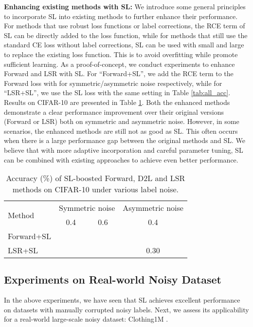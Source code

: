 \documentclass[10pt,twocolumn,letterpaper]{article}
\begin{document}
\noindent\textbf{Enhancing existing methods with SL:}
We introduce some general principles to incorporate SL into existing methods to further enhance their performance. For methods that use robust loss functions or label corrections, the RCE term of SL can be directly added to the loss function, while for methods that still use the standard CE loss without label corrections, SL can be used with small  and large  to replace the existing loss function. This is to avoid overfitting while promote sufficient learning. As a proof-of-concept, we conduct experiments to enhance Forward and LSR with SL. For ``Forward+SL'', we add the RCE term to the Forward loss with  for symmetric/asymmetric noise respectively, while for ``LSR+SL'', we use the SL loss with the same setting in Table \ref{tab:all_acc}. Results on CIFAR-10 are presented in Table \ref{tab:sce_d2l}. Both the enhanced methods demonstrate a clear performance improvement over their original versions (Forward or LSR) both on symmetric and asymmetric noise. However, in some scenarios, the enhanced methods are still not as good as SL. This often occurs when there is a large performance gap between the original methods and SL. We believe that with more adaptive incorporation and careful parameter tuning, SL can be combined with existing approaches to achieve even better performance.

\begin{table}[!t]
    \small
    \centering
    \caption{Accuracy (\%) of SL-boosted Forward, D2L and LSR methods on CIFAR-10 under various label noise.}
    \vspace{-0.1 in}
    \label{tab:sce_d2l}
    \begin{adjustbox}{width=0.49\textwidth}
    \begin{tabular}{l|cc|c}
    \hline
    \multirow{2}{*}{Method}  
    & \multicolumn{2}{c|}{Symmetric noise}  & \multicolumn{1}{c}{Asymmetric noise} \\
     & 0.4 & 0.6  & 0.4  \\
    \hline
    Forward+SL &  &  &  \\
    LSR+SL &  &  &  0.30\\
    \hline
    \end{tabular}
    \end{adjustbox}
    \vspace{-0.15 in}
\end{table}

\subsection{Experiments on Real-world Noisy Dataset}\label{sec:Clothing1M}
In the above experiments, we have seen that SL achieves excellent performance on datasets with manually corrupted noisy labels. Next, we assess its applicability for a real-world large-scale noisy dataset: Clothing1M \cite{xiao2015learning}. 
\end{document}
